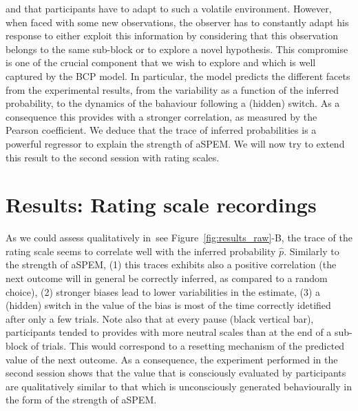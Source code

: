\documentclass[profile,final,english, draft]{article}%
\newcommand{\seeFig}[1]{see Figure~\ref{fig:#1}}
\begin{document}
and that participants have to adapt to such a volatile environment.
However, when faced with some new observations,
the observer has to constantly adapt his response
to either exploit this information by considering that
this observation belongs to the same sub-block or to explore
a novel hypothesis.
This compromise is one of the crucial component that we wish to explore
and which is well captured by the BCP model.
In particular, the model predicts the different facets
from the experimental results,
from the variability as a function of the inferred probability,
to the dynamics of the bahaviour following a (hidden) switch.
As a consequence this provides with a stronger correlation,
as measured by the Pearson coefficient.
We deduce that the trace of inferred probabilities is a powerful regressor
to explain the strength of aSPEM.
We will now try to extend this result
to the second session with rating scales.
\section{Results: Rating scale recordings}
\label{sec:rating_scale}
As we could assess qualitatively in~\seeFig{results_raw}-B,
the trace of the rating scale seems to correlate well
with the inferred probability $\hat{p}$.
Similarly to the strength of aSPEM,
(1) this traces exhibits also a positive correlation
(the next outcome will in general be correctly inferred,
as compared to a random choice),
(2) stronger biases lead to lower variabilities in the estimate,
(3) a (hidden) switch in the value of the bias is
most of the time correctly idetified after only a few trials.
Note also that at every pause (black vertical bar),
participants tended to provides with more neutral scales
than at the end of a sub-block of trials.
This would correspond to a resetting mechanism
of the predicted value of the next outcome.
As a consequence, the experiment performed in the second session
shows that the value that is consciously evaluated by participants
are qualitatively similar to that which is unconsciously generated behaviourally
in the form of the strength of aSPEM.
\end{document}
